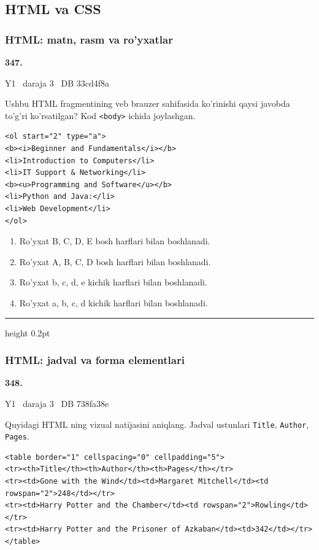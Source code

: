 \documentclass[10pt,a4paper,oneside]{article}
\begin{document}
\subsection{HTML va CSS}
\subsubsection{HTML: matn, rasm va ro'yxatlar}
\hypertarget{q347}{\textbf{\color{ink}347.}}  {\color{muted}\scriptsize Y1 \textbullet\ daraja 3 \textbullet\ DB 33cd4f8a}
\par
Ushbu HTML fragmentining veb brauzer sahifasida ko'rinishi qaysi javobda to'g'ri ko'rsatilgan? Kod \texttt{\textless{}body\textgreater{}} ichida joylashgan.

\par
\begin{lstlisting}
<ol start="2" type="a">
<b><i>Beginner and Fundamentals</i></b>
<li>Introduction to Computers</li>
<li>IT Support & Networking</li>
<b><u>Programming and Software</u></b>
<li>Python and Java:</li>
<li>Web Development</li>
</ol>
\end{lstlisting}

\begin{enumerate}[label=\Alph*),leftmargin=9mm]
\item Ro'yxat B, C, D, E bosh harflari bilan boshlanadi.
\item Ro'yxat A, B, C, D bosh harflari bilan boshlanadi.
\item Ro'yxat b, c, d, e kichik harflari bilan boshlanadi.
\item Ro'yxat a, b, c, d kichik harflari bilan boshlanadi.
\end{enumerate}
\vspace{2mm}\hrule height 0.2pt \vspace{4mm}
\subsubsection{HTML: jadval va forma elementlari}
\hypertarget{q348}{\textbf{\color{ink}348.}}  {\color{muted}\scriptsize Y1 \textbullet\ daraja 3 \textbullet\ DB 738fa38e}
\par
Quyidagi HTML ning vizual natijasini aniqlang. Jadval ustunlari \texttt{Title}, \texttt{Author}, \texttt{Pages}.

\par
\begin{lstlisting}
<table border="1" cellspacing="0" cellpadding="5">
<tr><th>Title</th><th>Author</th><th>Pages</th></tr>
<tr><td>Gone with the Wind</td><td>Margaret Mitchell</td><td rowspan="2">248</td></tr>
<tr><td>Harry Potter and the Chamber</td><td rowspan="2">Rowling</td></tr>
<tr><td>Harry Potter and the Prisoner of Azkaban</td><td>342</td></tr>
</table>
\end{lstlisting}
\end{document}
